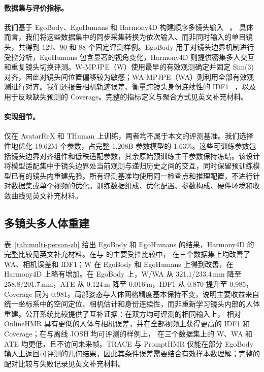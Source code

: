 \paragraph{数据集与评价指标。}
我们基于 EgoBody、EgoHumans 和 Harmony4D 构建顺序多镜头输入
~\citep{zhang2022egobody,khirodkar2023egohumans,khirodkar2024harmony4d}。
具体而言，我们将这些数据集中的同步采集转换为依次输入、而非同时输入的单目镜头，共得到 129、90 和 88 个固定评测样例。EgoBody 用于对镜头边界机制进行受控分析，EgoHumans 包含显著的视角变化，Harmony4D 则提供密集多人交互和重复镜头切换评测。W-MPJPE（W）使用最早的有效观测确定并固定 Sim(3) 对齐，因此对镜头间位置偏移较为敏感；WA-MPJPE（WA）则利用全部有效观测进行对齐。我们还报告相机轨迹误差、衡量跨镜头身份连续性的 IDF1
~\citep{ristani2016performance}，以及用于反映缺失预测的 Coverage。完整的指标定义与聚合方式见英文补充材料。

\paragraph{实现细节。}
\method{} 仅在 AvatarReX 和 THuman 上训练，两者均不属于本文的评测基准。我们选择性地优化 19.62M 个参数，占完整 1.208B 参数模型的 1.63\%。这些可训练参数包括镜头边界对齐组件和低秩适配参数，其余原始预训练主干参数保持冻结。该设计将模型适配集中于镜头边界处当前观测与递归历史之间的交互，同时保留预训练模型已有的镜头内重建先验。所有评测基准均使用同一检查点和推理配置，不进行针对数据集或单个视频的优化。训练数据组成、优化配置、参数构成、硬件环境和收敛曲线见英文补充材料。

\subsection{多镜头多人体重建}
\label{sec:main-results-zh}



表~\ref{tab:multi-person-zh} 给出 EgoBody 和 EgoHumans 的结果，Harmony4D 的完整比较见英文补充材料。在与 \humanthree{} 的主要受控比较中，\method{} 在三个数据集上均改善了 WA、相机误差和 IDF1；W 在 EgoBody 和 EgoHumans 上得到改善，在 Harmony4D 上略有增加。在 EgoBody 上，W/WA 从 321.1/233.4\,mm 降至 258.8/201.7\,mm，ATE 从 0.124\,m 降至 0.016\,m，IDF1 从 0.870 提升至 0.985，Coverage 同为 0.981。局部姿态与人体网格精度基本保持不变，说明主要收益来自统一坐标系中的空间定位、相机估计和身份连续性，而非重新学习镜头内部的人体重建。公开系统比较提供了互补证据：在双方均可评测的相同输入上，\method{} 相对 OnlineHMR 具有更低的人体与相机误差，并在全部视频上获得更高的 IDF1 和 Coverage；在与离线 JOSH 均可评测的样例上，\method{} 在三个数据集上的 W、WA 和 ATE 均更低，且不访问未来帧。TRACE 与 PromptHMR 仅能在部分 EgoBody 输入上返回可评测的几何结果，因此其条件误差需要结合有效样本数理解；完整的配对比较与失败记录见英文补充材料。

